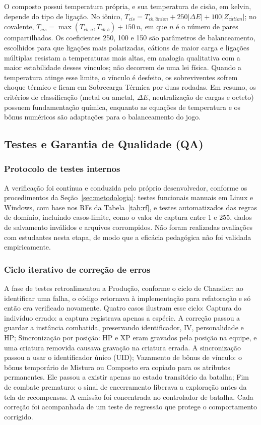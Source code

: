 O composto possui temperatura própria, e sua temperatura de cisão, em kelvin, depende do tipo de ligação. No iônico, $T_{cis}=T_{eb,\hat{a}nion}+250|\Delta E|+100|Z_{c\acute{a}tion}|$; no covalente, $T_{cis}=\max(T_{eb,a},T_{eb,b})+150\,n$, em que $n$ é o número de pares compartilhados. Os coeficientes 250, 100 e 150 são parâmetros de balanceamento, escolhidos para que ligações mais polarizadas, cátions de maior carga e ligações múltiplas resistam a temperaturas mais altas, em analogia qualitativa com a maior estabilidade desses vínculos; não decorrem de uma lei física. Quando a temperatura atinge esse limite, o vínculo é desfeito, os sobreviventes sofrem choque térmico e ficam em Sobrecarga Térmica por duas rodadas. Em resumo, os critérios de classificação (metal ou ametal, $\Delta E$, neutralização de cargas e octeto) possuem fundamentação química, enquanto as equações de temperatura e os bônus numéricos são adaptações para o balanceamento do jogo.

\subsection{Testes e Garantia de Qualidade (QA)}

\subsubsection{Protocolo de testes internos}
A verificação foi contínua e conduzida pelo próprio desenvolvedor, conforme os procedimentos da Seção~\ref{sec:metodologia}: testes funcionais manuais em Linux e Windows, com base nos RFs da Tabela~\ref{tab:rf}, e testes automatizados das regras de domínio, incluindo casos-limite, como o valor de captura entre 1 e 255, dados de salvamento inválidos e arquivos corrompidos. Não foram realizadas avaliações com estudantes nesta etapa, de modo que a eficácia pedagógica não foi validada empiricamente.

\subsubsection{Ciclo iterativo de correção de erros}
A fase de testes retroalimentou a Produção, conforme o ciclo de Chandler: ao identificar uma falha, o código retornava à implementação para refatoração e só então era verificado novamente. Quatro casos ilustram esse ciclo:
Captura do indivíduo errado: a captura registrava apenas a espécie. A correção passou a guardar a instância combatida, preservando identificador, IV, personalidade e HP;
Sincronização por posição: HP e XP eram gravados pela posição na equipe, e uma criatura removida causava gravação na criatura errada. A sincronização passou a usar o identificador único (UID);
Vazamento de bônus de vínculo: o bônus temporário de Mistura ou Composto era copiado para os atributos permanentes. Ele passou a existir apenas no estado transitório da batalha; Fim de combate prematuro: o sinal de encerramento liberava a exploração antes da tela de recompensas. A emissão foi concentrada no controlador de batalha.
Cada correção foi acompanhada de um teste de regressão que protege o comportamento corrigido.

